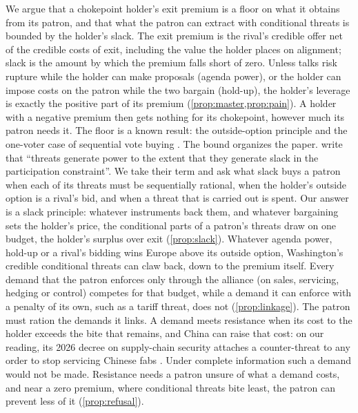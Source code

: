 We argue that a chokepoint holder's exit premium is a floor on what it obtains from its patron, and that what the patron can extract with conditional threats is bounded by the holder's slack. The exit premium is the rival's credible offer net of the credible costs of exit, including the value the holder places on alignment; slack is the amount by which the premium falls short of zero. Unless talks risk rupture while the holder can make proposals (agenda power), or the holder can impose costs on the patron while the two bargain (hold-up), the holder's leverage is exactly the positive part of its premium (\cref{prop:master,prop:pain}). A holder with a negative premium then gets nothing for its chokepoint, however much its patron needs it. The floor is a known result: the outside-option principle \citep{shaked1984involuntary, sutton1986noncooperative, binmore1989outside} and the one-voter case of sequential vote buying \citep{groseclose1996buying, dekel2008vote}. The bound organizes the paper. \citet{clayton2026putting} write that ``threats generate power to the extent that they generate slack in the participation constraint''. We take their term and ask what slack buys a patron when each of its threats must be sequentially rational, when the holder's outside option is a rival's bid, and when a threat that is carried out is spent. Our answer is a slack principle: whatever instruments back them, and whatever bargaining sets the holder's price, the conditional parts of a patron's threats draw on one budget, the holder's surplus over exit (\cref{prop:slack}). Whatever agenda power, hold-up or a rival's bidding wins Europe above its outside option, Washington's credible conditional threats can claw back, down to the premium itself. Every demand that the patron enforces only through the alliance (on sales, servicing, hedging or control) competes for that budget, while a demand it can enforce with a penalty of its own, such as a tariff threat, does not (\cref{prop:linkage}). The patron must ration the demands it links. A demand meets resistance when its cost to the holder exceeds the bite that remains, and China can raise that cost: on our reading, its 2026 decree on supply-chain security attaches a counter-threat to any order to stop servicing Chinese fabs \citep{statecouncil2026supplychain}. Under complete information such a demand would not be made. Resistance needs a patron unsure of what a demand costs, and near a zero premium, where conditional threats bite least, the patron can prevent less of it (\cref{prop:refusal}).

